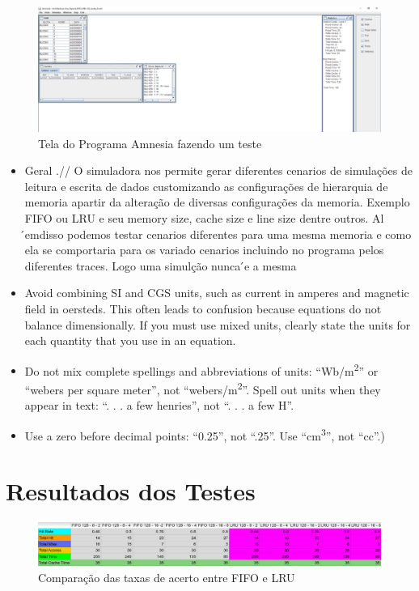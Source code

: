 \documentclass[conference]{IEEEtran}
\begin{document}
\begin{figure}
  \includegraphics[width=\linewidth]{Amnesia_screen.png}
  \caption{Tela do Programa Amnesia fazendo um teste}
  \label{fig:boat1}
\end{figure}

\begin{itemize}
\item  
Geral .//
O  simuladora  nos  permite  gerar  diferentes  cenarios  de simulações   de  leitura  e  escrita  de  dados  customizando  as configurações de hierarquia de memoria apartir da alteração de diversas  configurações  da  memoria.  Exemplo  FIFO  ou  LRU e seu memory size, cache size e line size dentre outros. Al ́emdisso  podemos  testar  cenarios  diferentes  para  uma  mesma memoria e como  ela  se  comportaria para os variado cenarios  incluindo  no  programa pelos diferentes traces. Logo uma simulção nunca ́e a mesma
\item Avoid combining SI and CGS units, such as current in amperes and magnetic field in oersteds. This often leads to confusion because equations do not balance dimensionally. If you must use mixed units, clearly state the units for each quantity that you use in an equation.
\item Do not mix complete spellings and abbreviations of units: ``Wb/m\textsuperscript{2}'' or ``webers per square meter'', not ``webers/m\textsuperscript{2}''. Spell out units when they appear in text: ``. . . a few henries'', not ``. . . a few H''.
\item Use a zero before decimal points: ``0.25'', not ``.25''. Use ``cm\textsuperscript{3}'', not ``cc''.)
\end{itemize}

\section{Resultados dos Testes}

\begin{figure}
    \centering
    \includegraphics[width=\linewidth]{Imagens/Tabela 1.png}
    \caption{Comparação das taxas de acerto entre FIFO e LRU}
    \label{fig:Comparação das taxas de acerto entre FIFO e LRU}
\end{figure}
\end{document}
